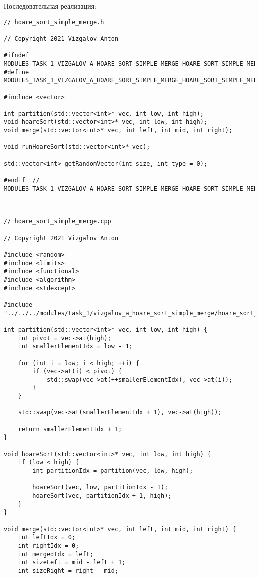 \documentclass{report}
\begin{document}
\par Последовательная реализация:
\begin{lstlisting}
// hoare_sort_simple_merge.h

// Copyright 2021 Vizgalov Anton

#ifndef MODULES_TASK_1_VIZGALOV_A_HOARE_SORT_SIMPLE_MERGE_HOARE_SORT_SIMPLE_MERGE_H_
#define MODULES_TASK_1_VIZGALOV_A_HOARE_SORT_SIMPLE_MERGE_HOARE_SORT_SIMPLE_MERGE_H_

#include <vector>

int partition(std::vector<int>* vec, int low, int high);
void hoareSort(std::vector<int>* vec, int low, int high);
void merge(std::vector<int>* vec, int left, int mid, int right);

void runHoareSort(std::vector<int>* vec);

std::vector<int> getRandomVector(int size, int type = 0);

#endif  // MODULES_TASK_1_VIZGALOV_A_HOARE_SORT_SIMPLE_MERGE_HOARE_SORT_SIMPLE_MERGE_H_



// hoare_sort_simple_merge.cpp

// Copyright 2021 Vizgalov Anton

#include <random>
#include <limits>
#include <functional>
#include <algorithm>
#include <stdexcept>

#include "../../../modules/task_1/vizgalov_a_hoare_sort_simple_merge/hoare_sort_simple_merge.h"

int partition(std::vector<int>* vec, int low, int high) {
    int pivot = vec->at(high);
    int smallerElementIdx = low - 1;

    for (int i = low; i < high; ++i) {
        if (vec->at(i) < pivot) {
            std::swap(vec->at(++smallerElementIdx), vec->at(i));
        }
    }

    std::swap(vec->at(smallerElementIdx + 1), vec->at(high));

    return smallerElementIdx + 1;
}

void hoareSort(std::vector<int>* vec, int low, int high) {
    if (low < high) {
        int partitionIdx = partition(vec, low, high);

        hoareSort(vec, low, partitionIdx - 1);
        hoareSort(vec, partitionIdx + 1, high);
    }
}

void merge(std::vector<int>* vec, int left, int mid, int right) {
    int leftIdx = 0;
    int rightIdx = 0;
    int mergedIdx = left;
    int sizeLeft = mid - left + 1;
    int sizeRight = right - mid;


\end{lstlisting}
\end{document}
